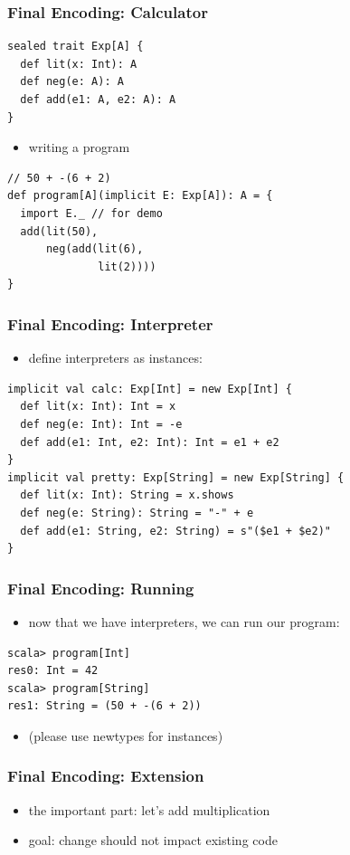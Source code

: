 \documentclass{beamer}
\begin{document}
\begin{frame}[fragile]
  \frametitle{Final Encoding: Calculator}
\begin{verbatim}
sealed trait Exp[A] {
  def lit(x: Int): A
  def neg(e: A): A
  def add(e1: A, e2: A): A
}
\end{verbatim}
  \begin{itemize}
  \item writing a program
  \end{itemize}
\begin{verbatim}
// 50 + -(6 + 2)
def program[A](implicit E: Exp[A]): A = {
  import E._ // for demo
  add(lit(50),
      neg(add(lit(6),
              lit(2))))
}
\end{verbatim}
\end{frame}

\begin{frame}[fragile]
  \frametitle{Final Encoding: Interpreter}
  \begin{itemize}
  \item define interpreters as instances:
  \end{itemize}
\begin{verbatim}
implicit val calc: Exp[Int] = new Exp[Int] {
  def lit(x: Int): Int = x
  def neg(e: Int): Int = -e
  def add(e1: Int, e2: Int): Int = e1 + e2
}
implicit val pretty: Exp[String] = new Exp[String] {
  def lit(x: Int): String = x.shows
  def neg(e: String): String = "-" + e
  def add(e1: String, e2: String) = s"($e1 + $e2)"
}
\end{verbatim}
\end{frame}

\begin{frame}[fragile]
  \frametitle{Final Encoding: Running}
  \begin{itemize}
  \item now that we have interpreters, we can run our program:
  \end{itemize}
\begin{verbatim}
scala> program[Int]
res0: Int = 42
scala> program[String]
res1: String = (50 + -(6 + 2))
\end{verbatim}
  \begin{itemize}
  \item (please use newtypes for instances)
  \end{itemize}
\end{frame}

\begin{frame}
  \frametitle{Final Encoding: Extension}
  \begin{itemize}
  \item the important part: let's add multiplication
  \item goal: change should not impact existing code
  \end{itemize}
\end{frame}
\end{document}
